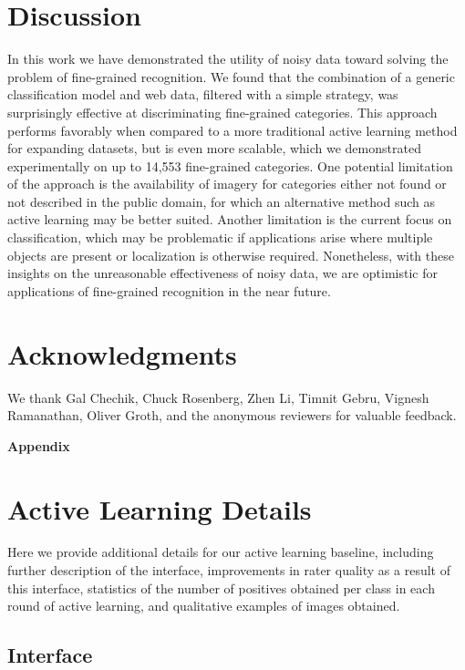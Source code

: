 \documentclass[runningheads]{llncs}
\begin{document}
\section{Discussion}
\label{sec:conclusion}
In this work we have demonstrated the utility of noisy data toward solving the problem of fine-grained recognition.
We found that the combination of a generic classification model and web data, filtered with a simple strategy, was surprisingly effective at discriminating fine-grained categories.
This approach performs favorably when compared to a more traditional active learning method for expanding datasets, but is even more scalable, which we demonstrated experimentally on up to 14,553 fine-grained categories.
One potential limitation of the approach is the availability of imagery for categories either not found or not described in the public domain, for which an alternative method such as active learning may be better suited.
Another limitation is the current focus on classification, which may be problematic if applications arise where multiple objects are present or localization is otherwise required.
Nonetheless, with these insights on the unreasonable effectiveness of noisy data, we are optimistic for applications of fine-grained recognition in the near future.

\section{Acknowledgments}
\label{sec:ack}
We thank Gal Chechik, Chuck Rosenberg, Zhen Li, Timnit Gebru, Vignesh Ramanathan, Oliver Groth, and the anonymous reviewers for valuable feedback.

\clearpage



\appendix
\noindent
{\LARGE{\textbf{Appendix}}}

\section{Active Learning Details}
Here we provide additional details for our active learning baseline, including further description of the interface, improvements in rater quality as a result of this interface, statistics of the number of positives obtained per class in each round of active learning, and qualitative examples of images obtained.

\subsection{Interface}
\end{document}
